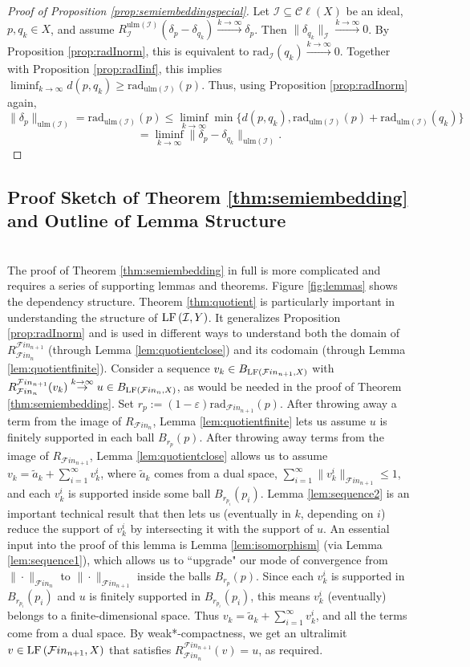 \documentclass[12pt]{amsart}
\theoremstyle{definition}
\numberwithin{equation}{section}
\def \F {\mathcal{F}in}
\def \I {\mathcal{I}}
\def \sbs {\subseteq}
\def \eps {\varepsilon}
\newcommand{\Cl}[1]{\mathcal{C}\ell\left(#1\right)}
\newcommand{\rad}[2]{\mathrm{rad}_{#1}\left(#2\right)}
\newcommand{\ulm}[1]{\mathrm{ulm}\left(#1\right)}
\begin{document}
\begin{proof}[Proof of Proposition \ref{prop:semiembeddingspecial}]
Let $\I \sbs \Cl{X}$ be an ideal, $p,q_k \in X$, and assume $R^{\ulm{\I}}_{\I}(\delta_p-\delta_{q_k}) \overset{k \to \infty}{\to} \delta_p$. Then $\|\delta_{q_k}\|_\I \overset{k \to \infty}{\to} 0$. By Proposition \ref{prop:radInorm}, this is equivalent to $\rad{\I}{q_k} \overset{k \to \infty}{\to} 0$. Together with Proposition \ref{prop:radIinf}, this implies $\liminf_{k \to \infty} d(p,q_k) \geq \rad{\ulm{\I}}{p}$. Thus, using Proposition \ref{prop:radInorm} again,
$$\|\delta_p\|_{\ulm{\I}} = \rad{\ulm{\I}}{p} \leq \liminf_{k \to \infty} \min\{d(p,q_k),\rad{\ulm{\I}}{p}+\rad{\ulm{\I}}{q_k}\}$$
$$= \liminf_{k \to \infty}\|\delta_p-\delta_{q_k}\|_{\ulm{\I}}.$$
\end{proof}

\subsection{Proof Sketch of Theorem \ref{thm:semiembedding} and Outline of Lemma Structure} ~\\
\indent The proof of Theorem \ref{thm:semiembedding} in full is more complicated and requires a series of supporting lemmas and theorems. Figure \ref{fig:lemmas} shows the dependency structure. Theorem \ref{thm:quotient} is particularly important in understanding the structure of $\LF{\I}{Y}$. It generalizes Proposition \ref{prop:radInorm} and is used in different ways to understand both the domain of $R^{\F_{n+1}}_{\F_n}$ (through Lemma \ref{lem:quotientclose}) and its codomain (through Lemma \ref{lem:quotientfinite}). Consider a sequence $v_k \in B_{\LF{\F_{n+1}}{X}}$ with $R^{\F_{n+1}}_{\F_n}(v_k) \overset{k \to \infty}{\to} u \in B_{\LF{\F_{n}}{X}}$, as would be needed in the proof of Theorem \ref{thm:semiembedding}. Set $r_p := (1-\eps)\rad{\F_{n+1}}{p}$. After throwing away a term from the image of $R_{\F_n}$, Lemma \ref{lem:quotientfinite} lets us assume $u$ is finitely supported in each ball $B_{r_p}(p)$. After throwing away terms from the image of $R_{\F_{n+1}}$, Lemma \ref{lem:quotientclose} allows us to assume $v_k = \tilde{a}_k + \sum_{i=1}^\infty v_k^i$, where $\tilde{a}_k$ comes from a dual space, $\sum_{i=1}^\infty \|v_k^i\|_{\F_{n+1}} \leq 1$, and each $v_k^i$ is supported inside some ball $B_{r_{p_i}}(p_i)$. Lemma \ref{lem:sequence2} is an important technical result that then lets us (eventually in $k$, depending on $i$) reduce the support of $v_k^i$ by intersecting it with the support of $u$. An essential input into the proof of this lemma is Lemma \ref{lem:isomorphism} (via Lemma \ref{lem:sequence1}), which allows us to ``upgrade" our mode of convergence from $\|\cdot\|_{\F_n}$ to $\|\cdot\|_{\F_{n+1}}$ inside the balls $B_{r_p}(p)$. Since each $v_k^i$ is supported in $B_{r_{p_i}}(p_i)$ and $u$ is finitely supported in $B_{r_{p_i}}(p_i)$, this means $v_k^i$ (eventually) belongs to a finite-dimensional space. Thus $v_k = \tilde{a}_k + \sum_{i=1}^\infty v_k^i$, and all the terms come from a dual space. By weak*-compactness, we get an ultralimit $v \in \LF{\F_{n+1}}{X}$ that satisfies $R^{\F_{n+1}}_{\F_n}(v) = u$, as required.
\end{document}
